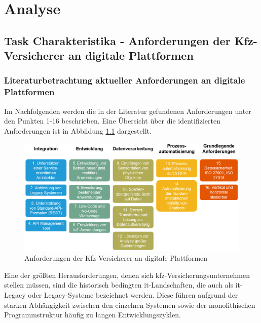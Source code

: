 \chapter{Analyse}
\section{Task Charakteristika - Anforderungen der Kfz-Versicherer an digitale Plattformen}

\subsection{Literaturbetrachtung aktueller Anforderungen an digitale Plattformen}


Im Nachfolgenden werden die in der Literatur gefundenen Anforderungen unter den Punkten 1-16 beschrieben. Eine Übersicht über die identifizierten Anforderungen ist in Abbildung \ref{fig:PPAnf} dargestellt.

\begin{figure}[h]
    \centering
    \includegraphics[width=1\textwidth]{img/PP_Anforderungen3.jpg}
    \caption[Anforderungen der Kfz-Versicherer an digitale Plattformen]{Anforderungen der Kfz-Versicherer an digitale Plattformen\autocite{PPAnf}}
    \label{fig:PPAnf}
\end{figure}

Eine der größten Herausforderungen, denen sich \ac{kfz}-Versicherungsunternehmen stellen müssen, sind die historisch bedingten \ac{it}-Landschaften, die auch als \ac{it}-Legacy oder Legacy-Systeme bezeichnet werden. Diese führen aufgrund der starken Abhängigkeit zwischen den einzelnen Systemen sowie der monolithischen Programmstruktur häufig zu langen Entwicklungszyklen. \autocite[Vgl.][S. 10-12]{GUNTER2020}


